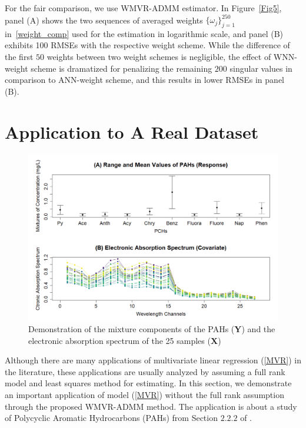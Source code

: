 \documentclass[alpha-refs]{wiley-article}
\begin{document}
For the fair comparison, we use WMVR-ADMM estimator.
In Figure~\ref{Fig5}, panel (A) shows the two sequences of averaged weights $\{\omega_{j}\}_{j=1}^{250}$ in~\eqref{weight_comp} used for the estimation in logarithmic scale,
and panel (B) exhibits 100 RMSEs with the respective weight scheme.
While the difference of the first $50$ weights between two weight schemes is negligible, the effect of WNN-weight scheme is dramatized for penalizing the remaining $200$ singular values in comparison to ANN-weight scheme, and this results in lower RMSEs in panel (B).

\section{Application to A Real Dataset}

\begin{figure}[b!]
    \centering
    \includegraphics[width = 120mm]{Figure/S6_P1.pdf}
    \caption{Demonstration of the mixture components of the PAHs ($\boldsymbol{Y}$) and the electronic absorption spectrum of the 25 samples ($\boldsymbol{X}$)}
    \label{fig:Realdata_XY}
\end{figure}

Although there are many applications of multivariate linear regression (\ref{MVR}) in the literature, these applications are usually analyzed by assuming a full rank model and least squares method for estimating.
In this section, we demonstrate an important application of model (\ref{MVR}) without the full rank assumption through the proposed WMVR-ADMM method.
The application is about a study of Polycyclic Aromatic Hydrocarbons (PAHs) from Section $2.2.2$ of \citet{isenmann2008modern}.
\end{document}

